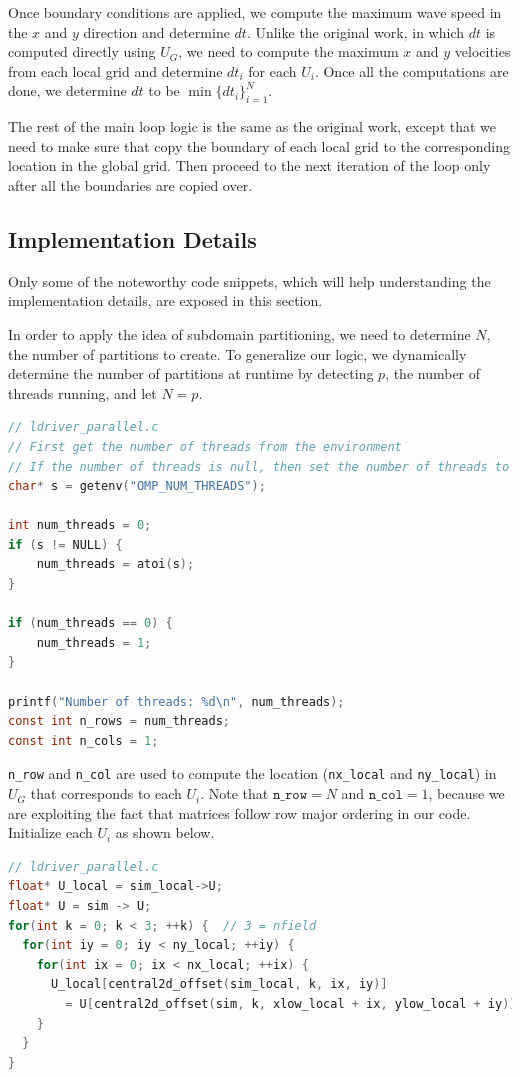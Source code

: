 \documentclass{article}
\begin{document}
Once boundary conditions are applied, we compute the maximum wave speed in the $x$ and $y$ direction and determine $dt$. Unlike the original work, in which $dt$ is computed directly using $U_G$, we need to compute the maximum $x$ and $y$ velocities from each local grid and determine $dt_i$ for each $U_i$. Once all the computations are done, we determine $dt$ to be $\min\{dt_i\}_{i=1}^N$.

The rest of the main loop logic is the same as the original work, except that we need to make sure that copy the boundary of each local grid to the corresponding location in the global grid. Then proceed to the next iteration of the loop only after all the boundaries are copied over.

\subsection{Implementation Details}

Only some of the noteworthy code snippets, which will help understanding the implementation details, are exposed in this section.

In order to apply the idea of subdomain partitioning, we need to determine $N$, the number of partitions to create. To generalize our logic, we dynamically determine the number of partitions at runtime by detecting $p$, the number of threads running, and let $N = p$.


\begin{lstlisting}[language=C]
// ldriver_parallel.c
// First get the number of threads from the environment
// If the number of threads is null, then set the number of threads to 1
char* s = getenv("OMP_NUM_THREADS");

int num_threads = 0;
if (s != NULL) {
    num_threads = atoi(s);
}

if (num_threads == 0) {
    num_threads = 1;
}

printf("Number of threads: %d\n", num_threads);
const int n_rows = num_threads;
const int n_cols = 1;
\end{lstlisting}

\texttt{n\_row} and \texttt{n\_col} are used to compute the location (\texttt{nx\_local} and \texttt{ny\_local}) in $U_G$ that corresponds to each $U_i$. Note that $\texttt{n\_row} = N$ and $\texttt{n\_col} = 1$, because we are exploiting the fact that matrices follow row major ordering in our code. Initialize each $U_i$ as shown below.

\begin{lstlisting}[language=C]
// ldriver_parallel.c
float* U_local = sim_local->U;
float* U = sim -> U;
for(int k = 0; k < 3; ++k) {  // 3 = nfield
  for(int iy = 0; iy < ny_local; ++iy) {
    for(int ix = 0; ix < nx_local; ++ix) {
      U_local[central2d_offset(sim_local, k, ix, iy)]
        = U[central2d_offset(sim, k, xlow_local + ix, ylow_local + iy)];
    }
  }
}
\end{lstlisting}
\end{document}
